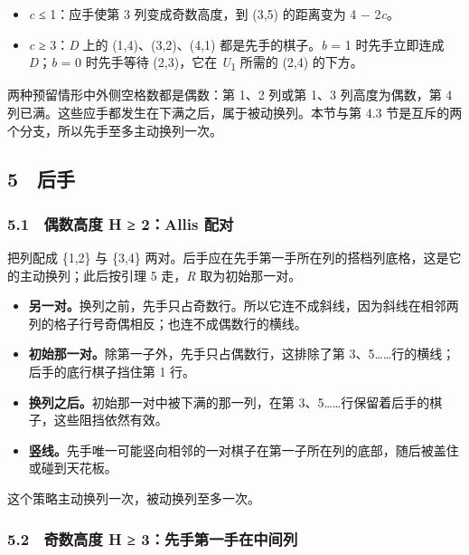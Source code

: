 \documentclass[
  a4paper,
]{article}
\providecommand{\tightlist}{%
  \setlength{\itemsep}{0pt}\setlength{\parskip}{0pt}}
\begin{document}
\begin{itemize}
\tightlist
\item
  \emph{c} ≤ 1：应手使第 3 列变成奇数高度，到 (3,5) 的距离变为 4 −
  2\emph{c}。
\item
  \emph{c} ≥ 3：\emph{D} 上的 (1,4)、(3,2)、(4,1)
  都是先手的棋子。\emph{b} = 1 时先手立即连成 \emph{D}；\emph{b} = 0
  时先手等待 (2,3)，它在 \emph{U}\textsubscript{1} 所需的 (2,4) 的下方。
\end{itemize}

两种预留情形中外侧空格数都是偶数：第 1、2 列或第 1、3 列高度为偶数，第 4
列已满。这些应手都发生在下满之后，属于被动换列。本节与第 4.3
节是互斥的两个分支，所以先手至多主动换列一次。

\subsection{5 后手}\label{ux540eux624b}

\subsubsection{5.1 偶数高度 H ≥ 2：Allis
配对}\label{ux5076ux6570ux9ad8ux5ea6-h-2allis-ux914dux5bf9}

把列配成 \{1,2\} 与 \{3,4\}
两对。后手应在先手第一手所在列的搭档列底格，这是它的主动换列；此后按引理
5 走，\emph{R} 取为初始那一对。

\begin{itemize}
\tightlist
\item
  \textbf{另一对。}换列之前，先手只占奇数行。所以它连不成斜线，因为斜线在相邻两列的格子行号奇偶相反；也连不成偶数行的横线。
\item
  \textbf{初始那一对。}除第一子外，先手只占偶数行，这排除了第
  3、5\ldots\ldots 行的横线；后手的底行棋子挡住第 1 行。
\item
  \textbf{换列之后。}初始那一对中被下满的那一列，在第
  3、5\ldots\ldots 行保留着后手的棋子，这些阻挡依然有效。
\item
  \textbf{竖线。}先手唯一可能竖向相邻的一对棋子在第一子所在列的底部，随后被盖住或碰到天花板。
\end{itemize}

这个策略主动换列一次，被动换列至多一次。

\subsubsection{5.2 奇数高度 H ≥
3：先手第一手在中间列}\label{ux5947ux6570ux9ad8ux5ea6-h-3ux5148ux624bux7b2cux4e00ux624bux5728ux4e2dux95f4ux5217}
\end{document}
